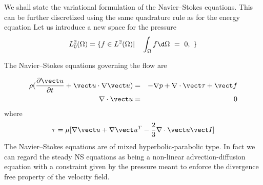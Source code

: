 
We shall state the variational formulation of the Navier--Stokes equations. This can be further discretized using the same quadrature rule as for the energy equation
Let us introduce a new space for the pressure
$$
L^2_0(\Omega)=\lbrace f \in L^2(\Omega) |\quad \int_{\Omega} f \d \Omega\ =\ 0,\ \rbrace
$$

The Navier--Stokes equations governing the flow are 

\begin{eqnarray}
\rho(\frac{\partial \vect u}{\partial t} +\vect u \cdot \nabla \vect u ) &=& -\nabla p+ \nabla \cdot \vect \tau+\vect f\\
\nabla \cdot \vect u &=& 0  \nonumber
\end{eqnarray}
where 
\begin{equation}
\tau =\mu[\nabla \vect u+\nabla \vect u^T-\frac{2}{3}\nabla \cdot \vect u \vect I]
\end{equation}
The Navier--Stokes equations are of mixed hyperbolic-parabolic type. In fact we can regard the steady NS equations as being a  non-linear advection-diffusion equation with a constraint given by the pressure meant to enforce the divergence free property of the velocity field. 

\begin{comment}
\section{$\mathbb{P}_N-\mathbb{P}_{N-2}$ discretization}

\end{comment}